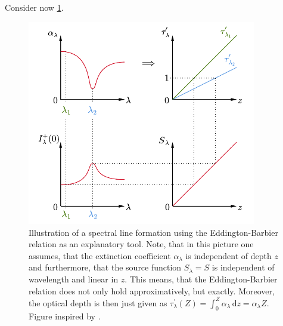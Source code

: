 \documentclass[a4paper,12pt]{report}
\begin{document}
Consider now \cref{fig:spectrallineformation}.
\begin{figure}[h]
\centering
\includegraphics[width=10cm]{figures/spectrallineformation.pdf}
\caption{Illustration of a spectral line formation using the Eddington-Barbier relation as an explanatory tool. Note, that in this picture one assumes, that the extinction coefficient $\alpha_\lambda$ is independent of depth $z$ and furthermore, that the source function $S_\lambda = S$ is independent of wavelength and linear in $z$. This means, that the Eddington-Barbier relation does not only hold approximatively, but exactly. Moreover, the optical depth is then just given as $\tau_\lambda^\prime(Z) = \int_{0}^{Z}\alpha_\lambda\,\mathrm{d}z = \alpha_\lambda Z$. Figure inspired by \cite[p.38]{Rutten.2015}.}
\label{fig:spectrallineformation}
\end{figure}
\end{document}
